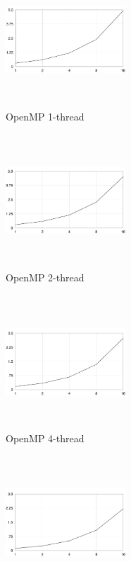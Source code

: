 \documentclass[11pt]{article}
\begin{document}
\begin{figure}[t]
    \centering
    \begin{subfigure}[h!]{0.3\textwidth}
        \centering
        \includegraphics[width=4.5cm,height=5cm,keepaspectratio]{o1}
        \caption{OpenMP 1-thread}
    \end{subfigure}
    \hfill
    \begin{subfigure}[h!]{0.3\textwidth}
        \centering
        \includegraphics[width=4.5cm,height=5cm,keepaspectratio]{o2}
        \caption{OpenMP 2-thread}
    \end{subfigure}
    \hfill
    \begin{subfigure}[h!]{0.3\textwidth}
        \centering
        \includegraphics[width=4.5cm,height=5cm,keepaspectratio]{o4}
        \caption{OpenMP 4-thread}
    \end{subfigure}
    \hfill
    \begin{subfigure}[h!]{0.3\textwidth}
        \centering
        \includegraphics[width=4.5cm,height=5cm,keepaspectratio]{o8}

\end{subfigure}
\end{figure}
\end{document}
